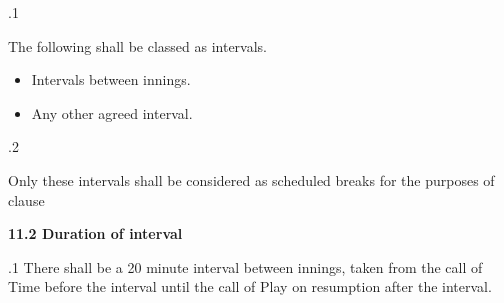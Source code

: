 \documentclass[12pt]{article}
\begin{document}
\vspace{\baselineskip}
{\fontsize{9pt}{10.8pt}.1 \tabto{0.49in} {\fontsize{8pt}{9.6pt}\selectfont The following shall be classed as intervals.\par}\par}\par


\vspace{\baselineskip}
\begin{itemize}
	\item {\fontsize{9pt}{10.8pt}\selectfont Intervals between innings.\par}\par


\vspace{\baselineskip}
	\item {\fontsize{9pt}{10.8pt}\selectfont Any other agreed interval.\par}
\end{itemize}\par


\vspace{\baselineskip}
{\fontsize{9pt}{10.8pt}.2 \tabto{0.49in} {\fontsize{8pt}{9.6pt}\selectfont Only these intervals shall be considered as scheduled breaks for the purposes of clause \par}\par}\par


\vspace{\baselineskip}

\vspace{\baselineskip}

\vspace{\baselineskip}

\vspace{\baselineskip}
\begin{Center}
{\fontsize{8pt}{9.6pt}\par}
\end{Center}\par


\vspace{\baselineskip}
{\fontsize{11pt}{13.2pt}\selectfont \textbf{11.2 \tabto{0.47in} Duration of interval}\par}\par


\vspace{\baselineskip}
\begin{adjustwidth}{0.5in}{0.1in}
{\fontsize{9pt}{10.8pt}.1 \tabto{0.49in} There shall be a 20 minute interval between innings, taken from the call of Time before the interval until the call of Play on resumption after the interval.\par}\par

\end{adjustwidth}
\end{document}
